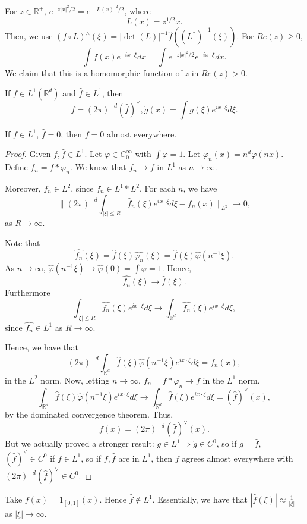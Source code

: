 \documentclass[11pt]{scrartcl}
\newcommand{\R}{\mathbb{R}}
\let \phi \varphi
\let \hat \widehat
\newcommand{\<}{\langle}
\renewcommand{\>}{\rangle}
\begin{document}
For $z \in \R^+$, $e^{-z|x|^2/2} = e^{-|L(x)|^2/2}$, where 
$$L(x) = z^{1/2}x.$$
Then, we use $(f \circ L)^\wedge(\xi) = |\det(L)|^{-1} \hat{f}((L^*)^{-1}(\xi)).$
For $Re(z) \ge 0$,
$$\int f(x)e^{-ix \cdot \xi}dx = \int e^{-z|x|^2/2}e^{-ix\cdot \xi}dx.$$
We claim that this is a homomorphic function of $z$ in $Re(z) > 0$.
\begin{fact} If $f \in L^1(\R^d)$ and $\hat{f }\in L^1$, then
$$f = (2\pi)^{-d} (\hat{f})^{\vee}, \check{g}(x) = \int g(\xi)e^{ix \cdot \xi}d\xi.$$
\end{fact}
\begin{corollary} If $f \in L^1$, $\hat{f} = 0$, then $f = 0$ almost everywhere.
\end{corollary}
\begin{proof}
Given $f, \hat{f} \in L^1$.  Let $\phi \in C_0^{\infty}$ with $\int \phi = 1$.  Let $\phi_n(x) = n^d \phi(nx)$.  Define $f_n = f * \phi_n$.  We know that $f_n \rightarrow f$ in $L^1$ as $n \rightarrow \infty$.  

Moreover, $f_n \in L^2$, since $f_n \in L^1 * L^2$.  For each $n$, we have $$\| (2\pi)^{-d} \int_{|\xi| \le R} \hat{f}_n(\xi)e^{ix \cdot \xi}d\xi - f_n(x)\|_{L^2} \rightarrow 0,$$
as $R \rightarrow \infty$.

Note that $$\hat{f_n}(\xi) = \hat{f}(\xi) \hat{\phi_n}(\xi) = \hat{f}(\xi) \hat{\phi}(n^{-1}\xi).$$
As $n \rightarrow \infty$, $\hat{\phi}(n^{-1}\xi) \rightarrow \hat{\phi}(0) = \int \phi = 1.$
Hence,
$$\hat{f_n}(\xi) \rightarrow \hat{f}(\xi).$$
Furthermore
$$\int_{|\xi| \le R} \hat{f_n}(\xi)e^{ix\cdot \xi} d\xi \rightarrow \int_{\R^d} \hat{f_n}(\xi) e^{ix\cdot \xi}d\xi,$$
since $\hat{f_n} \in L^1$ as $R \rightarrow \infty$.

Hence, we have that $$(2\pi)^{-d}\int_{\R^d}\hat{f}(\xi)\hat{\phi}(n^{-1}\xi)e^{ix\cdot \xi} d\xi = f_n(x),$$
in the $L^2$ norm.  Now, letting $n \rightarrow \infty$, $f_n = f * \phi_n \rightarrow f$ in the $L^1$ norm.
$$\int_{\R^d} \hat{f}(\xi)\hat{\phi}(n^{-1}\xi) e^{ix \cdot \xi}d\xi \rightarrow \int_{\R^d}\hat{f}(\xi)e^{ix\cdot \xi}d\xi = (\hat{f})^{\vee}(x),$$
by the dominated convergence theorem.  Thus,
$$f(x) = (2\pi)^{-d}(\hat{f})^{\vee}(x).$$
But we actually proved a stronger result:  $g \in L^1 \Longrightarrow \check{g} \in C^0$, so if $g = \hat{f}$, $(\hat{f})^{\vee} \in C^0$ if $f \in L^1$, so if $f, \hat{f}$ are in $L^1$, then $f$ agrees almost everywhere with $(2\pi)^{-d}(\hat{f})^\vee \in C^0$.
\end{proof}
\begin{example} Take $f(x) = 1_{[0, 1]}(x)$.  Hence $\hat{f} \not \in L^1$.  Essentially, we have that $|\hat{f}(\xi)| \approx \frac{1}{|\xi|}$ as $|\xi| \rightarrow \infty$.
\end{example}
\end{document}
